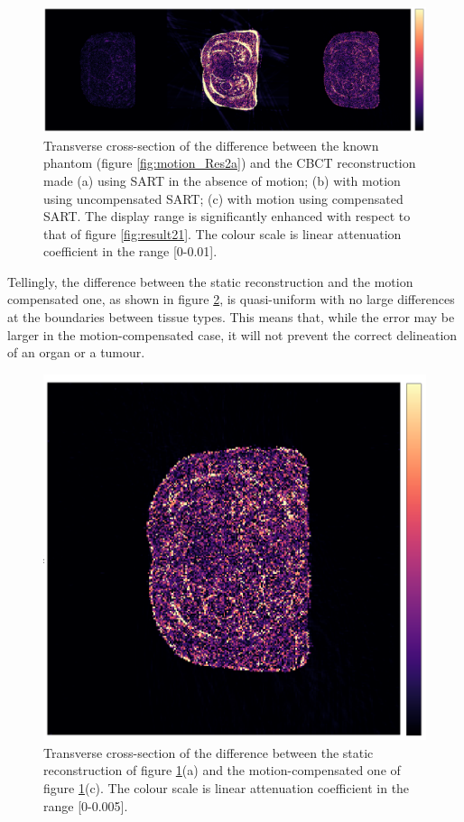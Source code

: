 \begin{figure}[ht]
\begin{center}
\includegraphics[width=1\linewidth]{MotionCorrection/motion21errorXCAT2.png}
\hspace{0.1cm}{\footnotesize (a)}\hspace{4.3cm}{\footnotesize (b)}\hspace{4.3cm}{\footnotesize (c)}

\caption{\label{fig:error2} Transverse cross-section of the difference between the known phantom (figure \ref{fig:motion_Res2a}) and the CBCT reconstruction made (a) using SART in the absence of motion; (b) with motion using uncompensated SART; (c) with motion using compensated SART.  The display range is significantly enhanced with respect to that of figure \ref{fig:result21}. The colour scale is linear attenuation coefficient in the range [0-0.01].} 
\end{center}
\end{figure}

Tellingly, the difference between the static reconstruction and the motion compensated one, as shown in figure \ref{fig:error23}, is quasi-uniform with no large differences at the boundaries between tissue types.  This means that, while the error may be larger in the motion-compensated case, it will not prevent the correct delineation of an organ or a tumour.

\begin{figure}[ht]
\begin{center}
\includegraphics[width=0.6\linewidth]{MotionCorrection/motion2errorXCAT2.png} 
\end{center}
\caption{\label{fig:error23} Transverse cross-section of the difference between the static reconstruction of figure \ref{fig:error2}(a) and the motion-compensated one of figure \ref{fig:error2}(c). The colour scale is linear attenuation coefficient in the range [0-0.005].} 
\end{figure}

